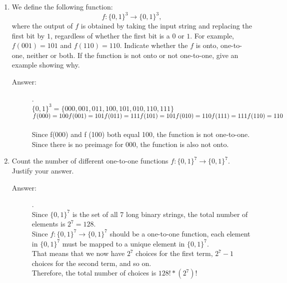 \documentclass[12pt, oneside]{article}
\begin{document}
\begin{enumerate}


\item We define the following function: $$f: \{0,1\}^3 \rightarrow \{0,1\}^3,$$ where the output of $f$ is obtained by taking the input string and replacing the first bit by $1$, regardless of whether the first bit is a $0$ or $1$. For example, $f(001) = 101$ and $f(110) = 110$. Indicate whether the $f$ is onto, one-to-one, neither or both. If the function is not onto or not one-to-one, give an example showing why. 

\begin{description}
    \item[Answer:] .\\
        $\{0,1\}^3 = \{000,001,011,100,101,010,110,111\}$\\
        $f(000) = 100\\
        f(001) = 101\\
        f(011) = 111\\
        f(101) = 101\\
        f(010) = 110\\
        f(111) = 111\\
        f(110) = 110$\\\\
        Since f(000) and f (100) both equal 100, the function is not one-to-one. Since there is no preimage for 000, the function is also not onto.
\end{description}

\item Count the number of different one-to-one functions $f: \{0,1\}^7 \rightarrow \{0,1\}^7$. Justify your answer.

\begin{description}
    \item[Answer:] .\\
        Since $\{0,1\}^7$ is the set of all 7 long binary strings, the total number of elements is $2^7 = 128$.\\
        Since $f: \{0,1\}^7 \rightarrow \{0,1\}^7$ should be a one-to-one function, each element in $\{0,1\}^7$ must be mapped to a unique element in $\{0,1\}^7$.\\
        That means that we now have $2^7$ choices for the first term, $2^7-1$ choices for the second term, and so on.\\
        Therefore, the total number of choices is $128!*(2^7)!$
\end{description}


\end{enumerate}
\end{document}
